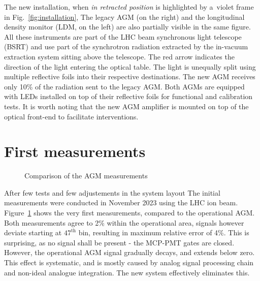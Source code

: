The new installation, when \textit{in retracted position} is  highlighted by a~violet frame in Fig.~\ref{fig:installation}, 
%
The legacy AGM  (on the right) and  the longitudinal density monitor (LDM, on the left) are also partially visible in the same figure. %
%
All these instruments are part of the LHC beam synchronous light telescope (BSRT) and use part of the synchrotron radiation extracted by the in-vacuum extraction system sitting above the telescope. %
%
The red arrow indicates the direction of the light entering the optical table.
%
The light is unequally split using multiple reflective foils into their respective destinations.  The new AGM receives  only 10\% of the radiation sent to the legacy AGM.
%
Both AGMs are equipped with LEDs installed  on top of their reflective foils for functional and calibration tests. 
%
%
It is worth noting  that the new AGM amplifier is mounted on top of the optical front-end to facilitate  interventions.

\section{First measurements}

\vspace{-5mm}
\begin{figure}[!htb]
    \begin{center}
        \scalebox{0.54}{}
        \caption{Comparison of the AGM measurements}
        \label{fig:comparison_chart}
    \end{center}
\end{figure}

\vspace{-5mm}
After few tests and few adjustements in the system layout The initial measurements were conducted in November 2023 using the LHC ion beam.
%
Figure~\ref{fig:comparison_chart} shows the very first measurements, compared to the operational AGM.
%
Both measurements agree to 2\% within the operational area, signals however deviate starting at $47^{\text{th}}$ bin, resulting in maximum relative error of 4\%.
%
This is surprising, as no signal shall be present - the MCP-PMT gates are closed. 
%
However, the operational AGM signal gradually decays, and extends below zero.
%
This effect is systematic, and is mostly caused by analog signal processing chain and non-ideal analogue integration.
%
The new system effectively eliminates this.


